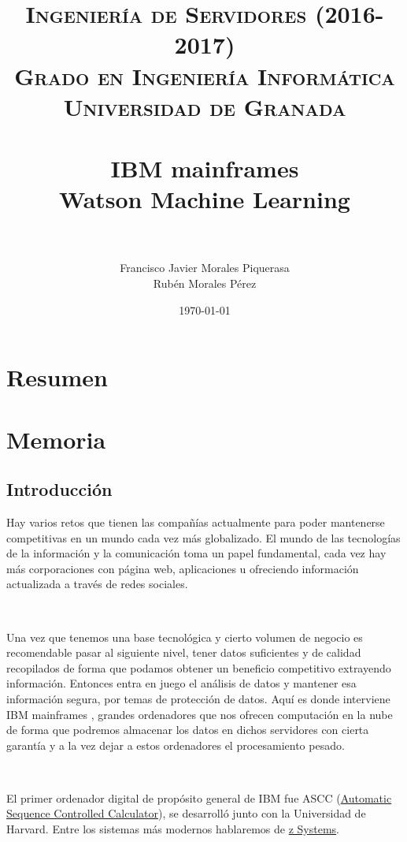 \documentclass[paper=a4, fontsize=10pt]{scrartcl} %
\title{	
\normalfont \normalsize 
\textsc{\textbf{Ingeniería de Servidores (2016-2017)} \\ Grado en Ingeniería Informática \\ Universidad de Granada} \\ [25pt] %
\horrule{0.5pt} \\[0.4cm] %
\huge IBM mainframes \\ Watson Machine Learning \\ %
\horrule{2pt} \\[0.5cm] %
}
\author{Francisco Javier Morales Piquerasa
	\\ Rubén Morales Pérez} %
\date{\normalsize\today} %
\numberwithin{equation}{section} %
\numberwithin{figure}{section} %
\numberwithin{table}{section} %
\begin{document}
\maketitle %
\newpage %
\tableofcontents %
\listoffigures
\listoftables

\newpage


\section{Resumen}


\section{Memoria}
\subsection{Introducción}
Hay varios retos que tienen las compañías actualmente para poder mantenerse competitivas en un mundo cada vez más globalizado.
El mundo de las tecnologías de la información y la comunicación toma un papel fundamental, cada vez hay más corporaciones con página web, aplicaciones u ofreciendo información actualizada a través de redes sociales.

\

Una vez que tenemos una base tecnológica  y cierto volumen de negocio es recomendable pasar al siguiente nivel, tener datos suficientes y de calidad recopilados de forma que podamos obtener un beneficio competitivo extrayendo información.
Entonces entra en juego el análisis de datos y mantener esa información segura, por temas de protección de datos.
Aquí es donde interviene IBM mainframes \cite{ibm-m}, grandes ordenadores que nos ofrecen computación en la nube de forma que podremos almacenar los datos en dichos servidores con cierta garantía y a la vez dejar a estos ordenadores el procesamiento pesado.

\

El primer ordenador digital de propósito general de IBM fue ASCC (\href{https://www-03.ibm.com/ibm/history/exhibits/markI/markI_intro.html}{Automatic Sequence Controlled Calculator}), se desarrolló junto con la Universidad de Harvard. Entre los sistemas más modernos hablaremos de \href{https://www-03.ibm.com/systems/z/}{z Systems}.
\end{document}

